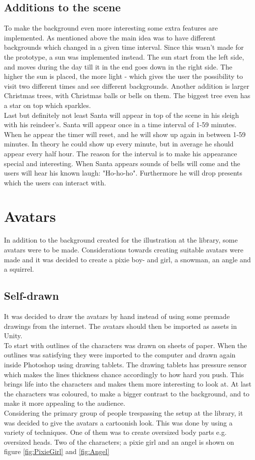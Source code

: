 \subsection{Additions to the scene}
To make the background even more interesting some extra features are implemented. As mentioned above the main idea was to have different backgrounds which changed in a given time interval. Since this wasn't made for the prototype, a sun was implemented instead. The sun start from the left side, and moves during the day till it in the end goes down in the right side. The higher the sun is placed, the more light - which gives the user the possibility to visit two different times and see different backgrounds. Another addition is larger Christmas trees, with Christmas balls or bells on them. The biggest tree even has a star on top which sparkles. \\
Last but definitely not least Santa will appear in top of the scene in his sleigh with his reindeer's. Santa will appear once in a time interval of 1-59 minutes. When he appear the timer will reset, and he will show up again in between 1-59 minutes. In theory he could show up every minute, but in average he should appear every half hour. The reason for the interval is to make his appearance special and interesting. When Santa appears sounds of bells will come and the users will hear his known laugh: "Ho-ho-ho". Furthermore he will drop presents which the users can interact with.

\section{Avatars}
In addition to the background created for the illustration at the library, some avatars were to be made. Considerations towards creating suitable avatars were made and it was decided to create a pixie boy- and girl, a snowman, an angle and a squirrel.
\subsection{Self-drawn}
It was decided to draw the avatars by hand instead of using some premade drawings from the internet. The avatars should then be imported as assets in Unity. \\
To start with outlines of the characters was drawn on sheets of paper. When the outlines was satisfying they were imported to the computer and drawn again inside Photoshop using drawing tablets. The drawing tablets has pressure sensor which makes the lines thickness chance accordingly to how hard you push. This brings life into the characters and makes them more interesting to look at. At last the characters was coloured, to make a bigger contrast to the background, and to make it more appealing to the audience.\\
Considering the primary group of people trespassing the setup at the library, it was decided to give the avatars a cartoonish look. This was done by using a variety of techniques. One of them was to create oversized body parts e.g. oversized heads. Two of the characters; a pixie girl and an angel is shown on figure \eqref{fig:PixieGirl} and \eqref{fig:Angel}

